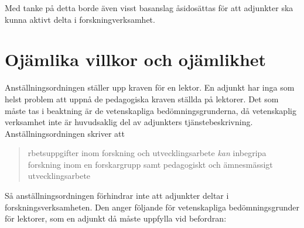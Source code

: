 \documentclass[a4paper,oneside,article,swedish]{memoir}
\let\section\chapter
\begin{document}
Med tanke på detta borde även visst basanslag åsidosättas för att adjunkter ska 
kunna aktivt delta i forskningverksamhet.


\section{Ojämlika villkor och 
ojämlikhet}\label{ForskandeAdjunkter}\label{OjämlikaVillkor}

Anställningsordningen\autocite{Anställningsordning} ställer upp kraven för en 
lektor.
En adjunkt har inga som helst problem att uppnå de pedagogiska kraven ställda 
på lektorer.
Det som måste tas i beaktning är de vetenskapliga bedömningsgrunderna, då 
vetenskaplig verksamhet inte är huvudsaklig del av adjunkters 
tjänstebeskrivning.
Anställningsordningen skriver att
\blockcquote[s.~20, min emfas]{Anställningsordning}{%
  rbetsuppgifter inom forskning och utvecklingsarbete \emph{kan} 
  inbegripa forskning inom en forskargrupp samt pedagogiskt och ämnesmässigt 
  utvecklingsarbete%
}.
Så anställningsordningen förhindrar inte att adjunkter deltar i 
forskningsverksamheten.
Den anger följande för vetenskapliga bedömningsgrunder för lektorer, som en 
adjunkt då måste uppfylla vid befordran:
\end{document}
